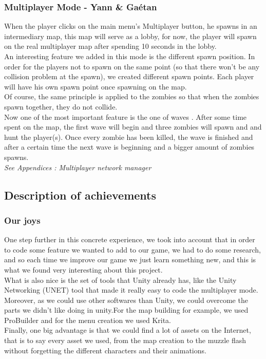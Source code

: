 \documentclass[12pt]{article}
\begin{document}
    \subsubsection{Multiplayer Mode - Yann \& Ga\'etan}
    
    	When the player clicks on the main menu's \guillemotleft \space Multiplayer \guillemotright \space button, he spawns in an intermediary map, this map will serve as a lobby, for now, the player will spawn on the real multiplayer map after spending 10 seconds in the lobby.\\
        
        An interesting feature we added in this mode is the different spawn position. In order for the players not to spawn on the same point (so that there won't be any collision problem at the spawn), we created different spawn points. Each player will have his own spawn point once spawning on the map.\\
        Of course, the same principle is applied to the zombies so that when the zombies spawn together, they do not collide.\\
        
        Now one of the most important feature is the one of \guillemotleft \space waves \guillemotright \space. After some time spent on the map, the first wave will begin and three zombies will spawn and and hunt the player(s). Once every zombie has been killed, the wave is finished and after a certain time the next wave is beginning and a bigger amount of zombies spawns.\\
        \textit{See Appendices : Multiplayer network manager}
\bigskip
\subsection{Description of achievements}

	\subsubsection{Our joys}
		One step further in this concrete experience, we took into account that in order to code some feature we wanted to add to our game, we had to do some research, and so each time we improve our game we just learn something new, and this is what we found very interesting about this project.\\
        What is also nice is the set of tools that Unity already has, like the Unity Networking (UNET) tool that made it really easy to code the multiplayer mode.\\
        Moreover, as we could use other softwares than Unity, we could overcome the parts we didn't like doing in unity.For the map building for example, we used ProBuilder and for the menu creation we used Krita.\\
\newpage
		Finally, one big advantage is that we could find a lot of assets on the Internet, that is to say every asset we used, from the map creation to the muzzle flash without forgetting the different characters and their animations.\\
        
\end{document}
